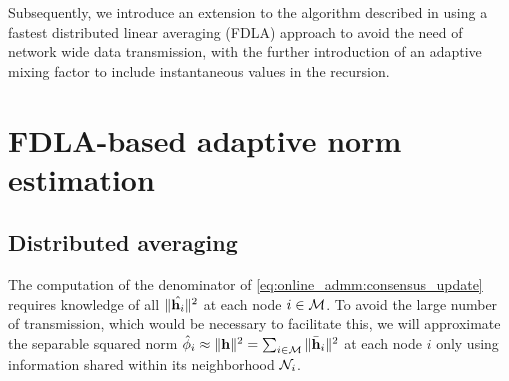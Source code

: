 \documentclass{article}
\begin{document}
Subsequently, we introduce an extension to the algorithm described in \cite{blochbergerDBSI} using a fastest distributed linear averaging (FDLA) approach \cite{xiaoFastLinearIterations2004} to avoid the need of network wide data transmission, with the further introduction of an adaptive mixing factor to include instantaneous values in the recursion.

\section{FDLA-based adaptive norm estimation}
\label{sec:adaptivenormest}

\subsection[]{Distributed averaging}
The computation of the denominator of \eqref{eq:online_admm:consensus_update} requires knowledge of all \(\|\hat{\bm{\mathrm{h}}_i}\|^2\) at each node \(i \in \mathcal{M}\).
To avoid the large number of transmission, which would be necessary to facilitate this, we will approximate the separable squared norm \(\hat{\phi}_i \approx \|\bm{\mathrm{h}}\|^2= \sum_{i \in \mathcal{M}} \|\bar{\bm{\mathrm{h}}}_i\|^2\) at each node \(i\) only using information shared within its neighborhood \(\mathcal{N}_i\).
\end{document}
